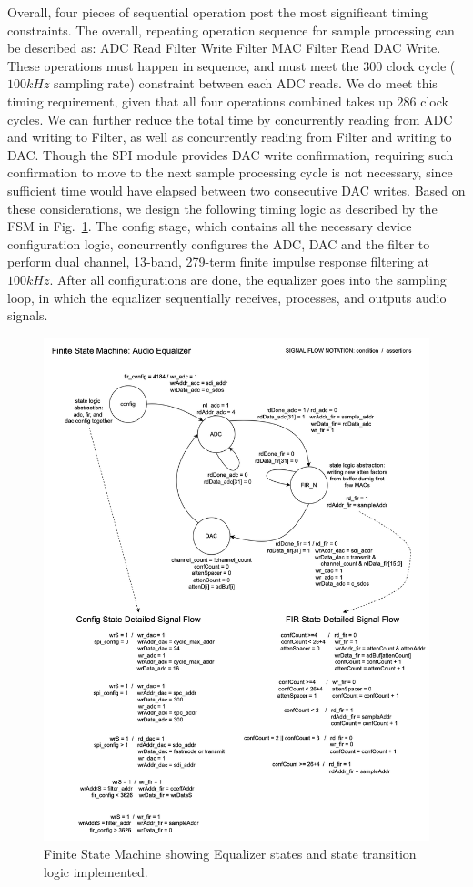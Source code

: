 \documentclass[journal]{IEEEtran} %
\begin{document}
Overall, four pieces of sequential operation post the most significant timing constraints. The overall, repeating operation sequence for sample processing can be described as: ADC Read \textrightarrow Filter Write \textrightarrow Filter MAC \textrightarrow Filter Read \textrightarrow DAC Write. These operations must happen in sequence, and must meet the $300$ clock cycle ($100kHz$ sampling rate) constraint between each ADC reads. We do meet this timing requirement, given that all four operations combined takes up $286$ clock cycles. We can further reduce the total time by concurrently reading from ADC and writing to Filter, as well as concurrently reading from Filter and writing to DAC. Though the SPI module provides DAC write confirmation, requiring such confirmation to move to the next sample processing cycle is not necessary, since sufficient time would have elapsed between two consecutive DAC writes. Based on these considerations, we design the following timing logic as described by the FSM in Fig.~\ref{fig:EQ_FSM}. The config stage, which contains all the necessary device configuration logic, concurrently configures the ADC, DAC and the filter to perform dual channel, 13-band, 279-term finite impulse response filtering at $100kHz$. After all configurations are done, the equalizer goes into the sampling loop, in which the equalizer sequentially receives, processes, and outputs audio signals. 

\begin{figure}[htbp]
\centering
\includegraphics[width=0.9\linewidth]{Figures/EQ/eq_fsm.png}
\caption{\label{fig:EQ_FSM}Finite State Machine showing Equalizer states and state transition logic implemented.}
\end{figure}
\end{document}
